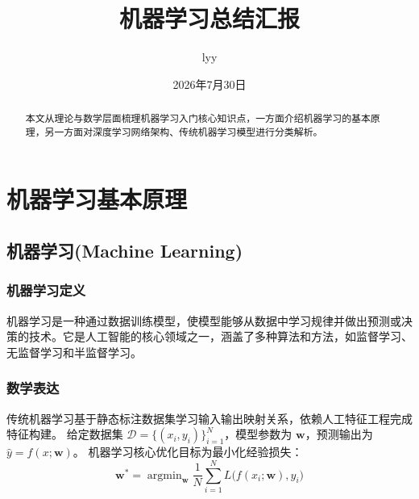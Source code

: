 \documentclass[12pt]{article}
\begin{document}
\title{机器学习总结汇报}
\author{lyy}
\date{2026年7月30日}
\maketitle
\begin{abstract}   
本文从理论与数学层面梳理机器学习入门核心知识点，一方面介绍机器学习的基本原理，另一方面对深度学习网络架构、传统机器学习模型进行分类解析。
\end{abstract}
\tableofcontents
\newpage


\section{机器学习基本原理}

\subsection{机器学习(Machine Learning)}
\subsubsection{机器学习定义}
机器学习是一种通过数据训练模型，使模型能够从数据中学习规律并做出预测或决策的技术。它是人工智能的核心领域之一，涵盖了多种算法和方法，如监督学习、无监督学习和半监督学习。
\subsubsection{数学表达}
传统机器学习基于静态标注数据集学习输入输出映射关系，依赖人工特征工程完成特征构建。
给定数据集 $\mathcal{D}=\{(x_i,y_i)\}_{i=1}^N$，模型参数为 $\boldsymbol{w}$，预测输出为 $\hat{y}=f(x;\boldsymbol{w})$。
机器学习核心优化目标为最小化经验损失：
\[
\boldsymbol{w}^*=\mathop{\arg\min}_{\boldsymbol{w}} \frac{1}{N}\sum_{i=1}^N L\big(f(x_i;\boldsymbol{w}),y_i\big)
\]
\end{document}
